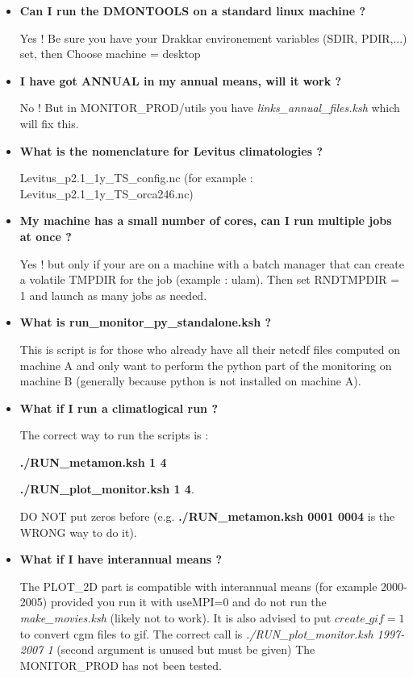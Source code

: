 \documentclass[a4paper,11pt]{article}
\begin{document}
\begin{itemize}
\item \textbf{Can I run the DMONTOOLS on a standard linux machine ?}

Yes ! Be sure you have your Drakkar environement variables (SDIR, PDIR,...) set, then Choose machine = desktop

\item \textbf{I have got ANNUAL in my annual means, will it work ?}

No ! But in MONITOR\_PROD/utils you have \textit{links\_annual\_files.ksh} which will fix this.

\item \textbf{What is the nomenclature for Levitus climatologies ?}

Levitus\_p2.1\_1y\_TS\_config.nc (for example : Levitus\_p2.1\_1y\_TS\_orca246.nc)

\item \textbf{My machine has a small number of cores, can I run multiple jobs at once ?}

Yes ! but only if your are on a machine with a batch manager that can create a volatile TMPDIR for the job
(example : ulam). Then set RNDTMPDIR = 1 and launch as many jobs as needed. 

\item \textbf{What is run\_monitor\_py\_standalone.ksh ?}

This is script is for those who already have all their netcdf files computed on machine A and only want to
perform the python part of the monitoring on machine B (generally because python is not installed on machine A).

\item \textbf{What if I run a climatlogical run ?}

The correct way to run the scripts is :

\textbf{./RUN\_meta\-mon.ksh 1 4} 

\textbf{./RUN\_plot\_moni\-tor.ksh 1 4}.

DO NOT put zeros before (e.g. \textbf{./RUN\_metamon.ksh 0001 0004} is the WRONG way to do it).

\item \textbf{What if I have interannual means ?}

The PLOT\_2D part is compatible with interannual means (for example 2000-2005) provided
you run it with useMPI=0 and do not run the \textit{make\_movies.ksh} (likely not to work).
It is also advised to put $create\_gif = 1$ to convert cgm files to gif.
The correct call is \textit{./RUN\_plot\_monitor.ksh 1997-2007 1} (second argument is unused but must be given)
The MONITOR\_PROD has not been tested.


\end{itemize}
\end{document}
